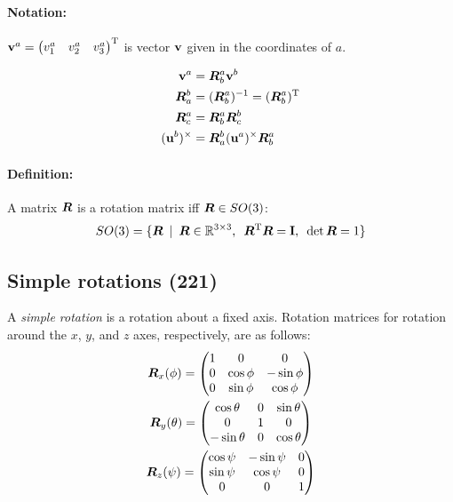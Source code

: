 \documentclass[a4paper, 12pt]{article}
\begin{document}
\paragraph{Notation:} \( \mathbf{v}^a = \begin{pmatrix} v_1^a & v_2^a & v_3^a \end{pmatrix}^{\text{T}} \) is vector \( \mathbf{v} \) given in the coordinates of \(a\).

\begin{equation}
	\begin{aligned}
		\mathbf{v}^a				&= \bm{R}_b^a \mathbf{v}^b \\
		\bm{R}_a^b				&= (\bm{R}_b^a)^{-1} = (\bm{R}_b^a)^{\text{T}} \\
		\bm{R}^a_c				&= \bm{R}^a_b \bm{R}^b_c \\
		(\mathbf{u}^b)^\times	&= \bm{R}^b_a (\mathbf{u}^a)^\times \bm{R}^a_b \\
	\end{aligned}
\end{equation}
\paragraph{Definition:} A matrix \(\bm{R}\) is a rotation matrix iff \(\bm{R} \in SO(3)\):
\begin{equation}
	SO(3) = \lbrace \bm{R} \enspace |
	\enspace \bm{R} \in \mathbb{R}^{3 \times 3},
	\enspace \bm{R}^{\text{T}}\bm{R} = \mathbf{I},
	\enspace \det \bm{R} = 1 \rbrace
\end{equation}

\subsection{Simple rotations (221)}
A \emph{simple rotation} is a rotation about a fixed axis. Rotation matrices for rotation around the \( x \), \( y \), and \( z \) axes, respectively, are as follows:
\begin{gather}\label{eq:simplerot}
	\bm{R}_x(\phi) =
	\begin{pmatrix}
		1 & 0         & 0          \\
		0 & \cos \phi & -\sin \phi \\
		0 & \sin \phi & \cos \phi  \\
	\end{pmatrix} \\
	\bm{R}_y(\theta) =
	\begin{pmatrix}
		\cos \theta  & 0 & \sin \theta \\
		0            & 1 & 0           \\
		-\sin \theta & 0 & \cos \theta \\
	\end{pmatrix} \\
	\bm{R}_z(\psi) =
	\begin{pmatrix}
		\cos \psi & -\sin \psi & 0 \\
		\sin \psi & \cos \psi  & 0 \\
		0         & 0          & 1 \\
	\end{pmatrix}
\end{gather}
\end{document}
